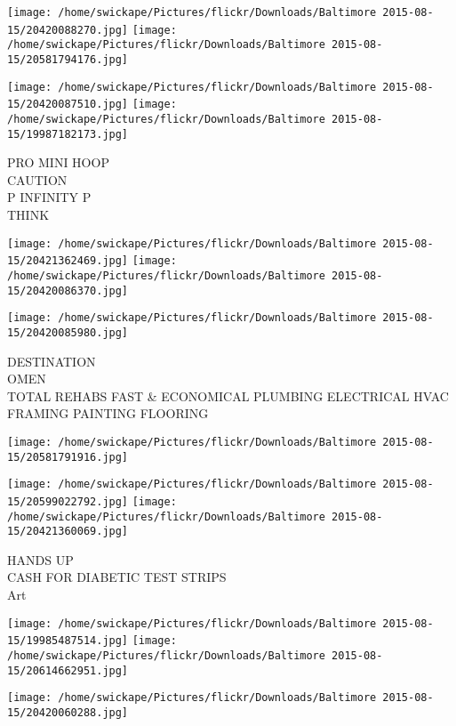 \documentclass[10pt,letterpaper]{article}
\begin{document}
\texttt{[image: /home/swickape/Pictures/flickr/Downloads/Baltimore 2015-08-15/20420088270.jpg]}
\texttt{[image: /home/swickape/Pictures/flickr/Downloads/Baltimore 2015-08-15/20581794176.jpg]}

\texttt{[image: /home/swickape/Pictures/flickr/Downloads/Baltimore 2015-08-15/20420087510.jpg]}
\texttt{[image: /home/swickape/Pictures/flickr/Downloads/Baltimore 2015-08-15/19987182173.jpg]}

PRO MINI HOOP\\
CAUTION\\
P INFINITY P\\
THINK\\
\pagebreak

\texttt{[image: /home/swickape/Pictures/flickr/Downloads/Baltimore 2015-08-15/20421362469.jpg]}
\texttt{[image: /home/swickape/Pictures/flickr/Downloads/Baltimore 2015-08-15/20420086370.jpg]}

\texttt{[image: /home/swickape/Pictures/flickr/Downloads/Baltimore 2015-08-15/20420085980.jpg]}

DESTINATION\\
OMEN\\
TOTAL REHABS FAST \& ECONOMICAL PLUMBING ELECTRICAL HVAC FRAMING PAINTING FLOORING\\
\pagebreak

\texttt{[image: /home/swickape/Pictures/flickr/Downloads/Baltimore 2015-08-15/20581791916.jpg]}

\vspace{0.25in}
\texttt{[image: /home/swickape/Pictures/flickr/Downloads/Baltimore 2015-08-15/20599022792.jpg]}
\texttt{[image: /home/swickape/Pictures/flickr/Downloads/Baltimore 2015-08-15/20421360069.jpg]}

HANDS UP\\
CASH FOR DIABETIC TEST STRIPS\\
Art\\
\pagebreak

\texttt{[image: /home/swickape/Pictures/flickr/Downloads/Baltimore 2015-08-15/19985487514.jpg]}
\texttt{[image: /home/swickape/Pictures/flickr/Downloads/Baltimore 2015-08-15/20614662951.jpg]}

\vspace{0.25in}
\texttt{[image: /home/swickape/Pictures/flickr/Downloads/Baltimore 2015-08-15/20420060288.jpg]}
\end{document}
